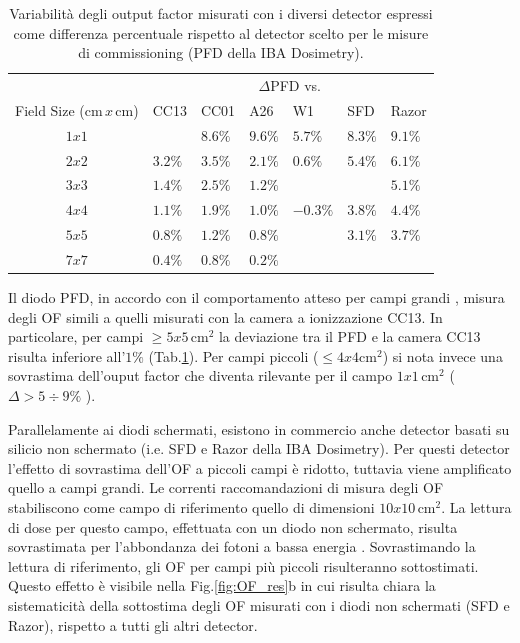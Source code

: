 \begin{table}
\centering
{}
\begin{tabular}{cllllll}
\toprule
  & \multicolumn{6}{c}{$\Delta$PFD vs.}\\
  \cmidrule{2-7}
 
Field Size (cm$\,x\,$cm) & CC13 & CC01 & A26 & W1 & SFD & Razor\\
\midrule
$1x1$ &        & $8.6\%$ & $9.6\%$ & $5.7\%$ & $8.3\%$ & $9.1\%$\\
$2x2$ & $3.2\%$ & $3.5\%$ & $2.1\%$ & $0.6\%$ & $5.4\%$ & $6.1\%$\\
$3x3$ & $1.4\%$ & $2.5\%$ & $1.2\%$ &  &      & $5.1\%$ \\
$4x4$ & $1.1\%$ & $1.9\%$ & $1.0\%$ & $-0.3\%$ & $3.8\%$ & $4.4\%$ \\
$5x5$ & $0.8\%$ & $1.2\%$ & $0.8\%$	&         & $3.1\%$ & $3.7\%$ \\
$7x7$ & $0.4\%$ & $0.8\%$ & $0.2\%$	&         &         &         \\
\bottomrule
\end{tabular}
\caption{Variabilità degli output factor misurati con i diversi detector espressi come differenza percentuale rispetto al detector scelto per le misure di commissioning (PFD della IBA Dosimetry).}
\label{tab:delta_OF}
\end{table}

Il diodo PFD, in accordo con il comportamento atteso per campi grandi \cite{Griessbach2005}, misura degli OF simili a quelli misurati con la camera a ionizzazione CC13. In particolare, per campi $\geq 5x5\,$cm$^2$ la deviazione tra il PFD e la camera CC13 risulta inferiore all'$1\%$ (Tab.\ref{tab:delta_OF}). Per campi piccoli ($\leq 4x4$cm$^2$) si nota invece una sovrastima dell'ouput factor che diventa rilevante per il campo $1x1\,$cm$^2$ ($\Delta > 5\div9\%$ ).

Parallelamente ai diodi schermati, esistono in commercio anche detector basati su silicio non schermato (i.e. SFD e Razor della IBA Dosimetry). Per questi detector l'effetto di sovrastima dell'OF a piccoli campi è ridotto, tuttavia viene amplificato quello a campi grandi. Le correnti raccomandazioni di misura degli OF \cite{Andreo2006,RaySearchLaboratories2014} stabiliscono come campo di riferimento quello di dimensioni $10x10\,$cm$^2$. La lettura di dose per questo campo, effettuata con un diodo non schermato, risulta sovrastimata per l'abbondanza dei fotoni a bassa energia \cite{Griessbach2005}. Sovrastimando la lettura di riferimento, gli OF per campi più piccoli risulteranno sottostimati. Questo effetto è visibile nella Fig.\ref{fig:OF_res}b in cui risulta chiara la sistematicità della sottostima degli OF misurati con i diodi non schermati (SFD e Razor), rispetto a tutti gli altri detector.

